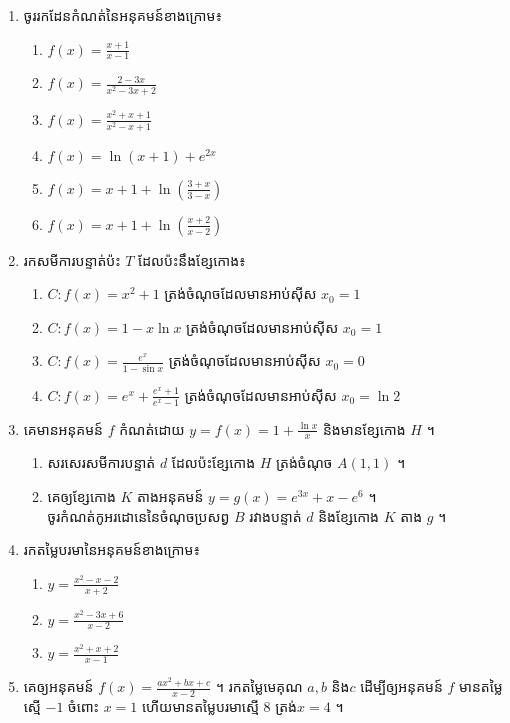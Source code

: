 \documentclass[12pt, a4paper]{article}
\begin{document}
	\begin{enumerate}[m]
		\item ចូររកដែនកំណត់នៃអនុគមន៍ខាងក្រោម៖
			\begin{enumerate}[k,2]
				\item $f(x)=\frac{x+1}{x-1}$
				\item $f(x)=\frac{2-3x}{x^2-3x+2}$
				\item $f(x)=\frac{x^2+x+1}{x^2-x+1}$
				\item $f(x)=\ln\left( x+1\right)+e^{2x}$
				\item $f(x)=x+1+\ln\left(\frac{3+x}{3-x}\right)$
				\item $f(x)=x+1+\ln\left(\frac{x+2}{x-2}\right)$
			\end{enumerate}
		\item រកសមីការបន្ទាត់ប៉ះ $T$ ដែលប៉ះនឹងខ្សែកោង៖
			\begin{enumerate}[k]
				\item $C: f(x)=x^2+1$ ត្រង់ចំណុចដែលមានអាប់ស៊ីស $x_0 =1$
				\item $C: f(x)=1-x\ln x$ ត្រង់ចំណុចដែលមានអាប់ស៊ីស $x_0 =1$
				\item $C: f(x)=\frac{e^x}{1-\sin x}$ ត្រង់ចំណុចដែលមានអាប់ស៊ីស $x_0 =0$
				\item $C: f(x)=e^x+\frac{e^x+1}{e^x-1}$ ត្រង់ចំណុចដែលមានអាប់ស៊ីស $x_0 =\ln2$
			\end{enumerate}
		\item គេមានអនុគមន៍ $f$ កំណត់ដោយ $y=f(x)=1+\frac{\ln x}{x}$ និងមានខ្សែកោង $H$ ។
			\begin{enumerate}[k]
				\item សរសេរសមីការបន្ទាត់ $d$ ដែលប៉ះខ្សែកោង $H$ ត្រង់ចំណុច $A(1, 1)$ ។
				\item គេឲ្យខ្សែកោង $K$ តាងអនុគមន៍ $y=g(x)=e^{3x}+x-e^6$ ។ \\
				ចូរកំណត់កូអរដោនេនៃចំណុចប្រសព្វ $B$ រវាងបន្ទាត់ $d$ និងខ្សែកោង $K$ តាង $g$ ។
			\end{enumerate}
		\item រកតម្លៃបរមានៃអនុគមន៍ខាងក្រោម៖
			\begin{enumerate}[k,3]
				\item $y=\frac{x^2-x-2}{x+2}$
				\item $y=\frac{x^2-3x+6}{x-2}$
				\item $y=\frac{x^2+x+2}{x-1}$
			\end{enumerate}
		\item គេឲ្យអនុគមន៍ $f(x)=\frac{ax^2+bx+c}{x-2}$ ។ រកតម្លៃមេគុណ $a, b$ និង$c$ ដើម្បីឲ្យអនុគមន៍ $f$ មានតម្លៃស្មើ $-1$ ចំពោះ $x=1$ ហើយមានតម្លៃបរមាស្មើ $8$ ត្រង់$x=4$ ។

\end{enumerate}
\end{document}
